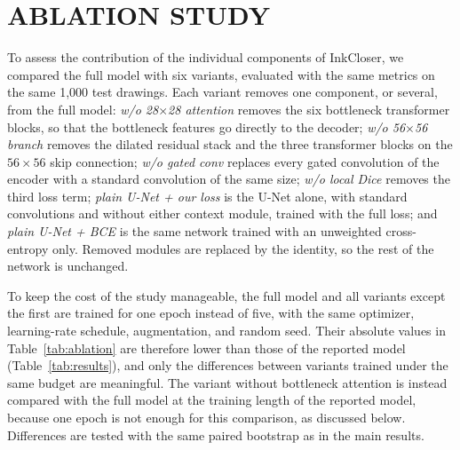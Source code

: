 \documentclass{IEEEcsmag}
\providecommand{\DIFaddtex}[1]{{\color{blue}#1}} %
\providecommand{\DIFaddbegin}{} %
\providecommand{\DIFaddtex}[1]{\DIFaddtex{#1}} %
\providecommand{\DIFaddbegin}{} %
\providecommand{\DIFadd}[1]{\texorpdfstring{\DIFaddtex{#1}}{#1}} %
\begin{document}
\DIFaddbegin \section{\DIFadd{ABLATION STUDY}}

\DIFadd{To assess the contribution of the individual components of InkCloser, we compared
the full model with six variants, evaluated with the same metrics on the same 1,000
test drawings. Each variant removes one component, or several, from the full model:
\emph{w/o 28$\times$28 attention} removes the six bottleneck transformer blocks, so
that the bottleneck features go directly to the decoder; \emph{w/o 56$\times$56
branch} removes the dilated residual stack and the three transformer blocks on the
$56\times 56$ skip connection; \emph{w/o gated conv} replaces every gated
convolution of the encoder with a standard convolution of the same size;
\emph{w/o local Dice} removes the third loss term; \emph{plain U-Net + our loss} is
the U-Net alone, with standard convolutions and without either context module,
trained with the full loss; and \emph{plain U-Net + BCE} is the same network trained
with an unweighted cross-entropy only. Removed modules are replaced by the identity,
so the rest of the network is unchanged.
}

\DIFadd{To keep the cost of the study manageable, the full model and all variants except
the first are trained for one epoch instead of five, with the same optimizer,
learning-rate schedule, augmentation, and random seed. Their absolute values in
Table~\ref{tab:ablation} are therefore lower than those of the reported model
(Table~\ref{tab:results}), and only the differences between variants trained under
the same budget are meaningful. The variant without bottleneck attention is instead
compared with the full model at the training length of the reported model, because
one epoch is not enough for this comparison, as discussed below. Differences are
tested with the same paired bootstrap as in the main results.
}
\end{document}
